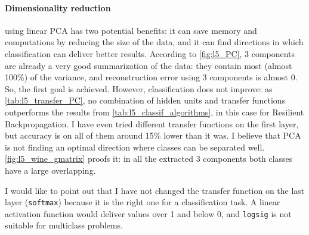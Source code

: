 \documentclass[a4paper, 10pt]{article}
\begin{document}
  \newpage
  \paragraph{Dimensionality reduction} using linear PCA has two potential benefits:
  it can save memory and computations by reducing the size of the data, and it
  can find directions in which classification can deliver better results. According
  to \autoref{fig:l5_PC}, 3 components are already a very good summarization of
  the data: they contain most (almost 100\%) of the variance, and reconstruction
  error using 3 components is almost 0. So, the first goal is achieved. However,
  classification does not improve: as \autoref{tab:l5_transfer_PC}, no combination
  of hidden units and transfer functions outperforms the results from 
  \autoref{tab:l5_classif_algorithms}, in this case for Resilient Backpropagation.
  I have even tried different transfer functions on the first layer, but accuracy
  is on all of them around 15\% lower than it was. I believe that PCA is not finding
  an optimal direction where classes can be separated well. 
  \autoref{fig:l5_wine_gmatrix} proofs it: in all the extracted 3 components 
  both classes have a large overlapping.

  I would like to point out that I have not changed the transfer function on the
  last layer (\texttt{softmax}) because it is the right one for a classification 
  task. A linear activation function would deliver values over 1 and below 0, and
  \texttt{logsig} is not suitable for multiclass problems. 
\end{document}

